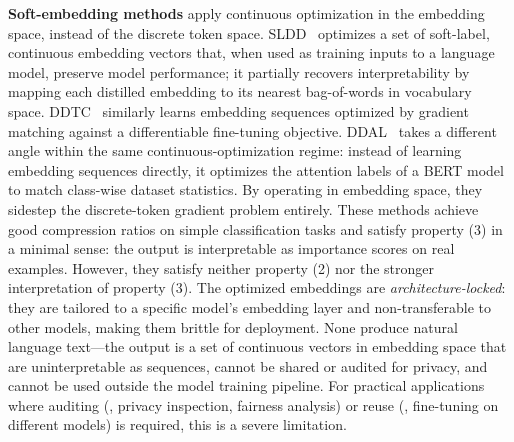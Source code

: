 \begin{foldable}
  \textbf{Soft-embedding methods} apply continuous optimization in the embedding space, instead of the discrete token space.
  SLDD~\cite{sucholutsky2021soft} optimizes a set of soft-label, continuous embedding vectors that, when used as training inputs to a language model, preserve model performance; it partially recovers interpretability by mapping each distilled embedding to its nearest bag-of-words in vocabulary space.
  DDTC~\cite{li2021data} similarly learns embedding sequences optimized by gradient matching against a differentiable fine-tuning objective.
  DDAL~\cite{maekawa2023dataset} takes a different angle within the same continuous-optimization regime: instead of learning embedding sequences directly, it optimizes the attention labels of a BERT model to match class-wise dataset statistics.
  By operating in embedding space, they sidestep the discrete-token gradient problem entirely.
  These methods achieve good compression ratios on simple classification tasks and satisfy property (3) in a minimal sense: the output is interpretable as importance scores on real examples.
  However, they satisfy neither property (2) nor the stronger interpretation of property (3).
  The optimized embeddings are \textit{architecture-locked}: they are tailored to a specific model's embedding layer and non-transferable to other models, making them brittle for deployment.
  None produce natural language text---the output is a set of continuous vectors in embedding space that are uninterpretable as sequences, cannot be shared or audited for privacy, and cannot be used outside the model training pipeline.
  For practical applications where auditing (\eg, privacy inspection, fairness analysis) or reuse (\eg, fine-tuning on different models) is required, this is a severe limitation.
\end{foldable}

